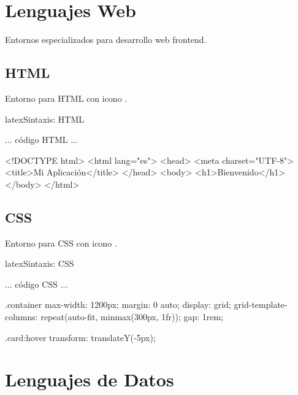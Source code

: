 \section{Lenguajes Web}
\label{sec:web}

Entornos especializados para desarrollo web frontend.

\subsection{HTML}

Entorno para HTML con icono .

\begin{codigosimple}{latex}{Sintaxis: HTML}
\begin{htmlcode}
  ... código HTML ...
\end{htmlcode}
\end{codigosimple}

\begin{htmlcode}
<!DOCTYPE html>
<html lang="es">
<head>
    <meta charset="UTF-8">
    <title>Mi Aplicación</title>
</head>
<body>
    <h1>Bienvenido</h1>
</body>
</html>
\end{htmlcode}

\subsection{CSS}

Entorno para CSS con icono .

\begin{codigosimple}{latex}{Sintaxis: CSS}
\begin{csscode}
  ... código CSS ...
\end{csscode}
\end{codigosimple}

\begin{csscode}
.container {
    max-width: 1200px;
    margin: 0 auto;
    display: grid;
    grid-template-columns: repeat(auto-fit, minmax(300px, 1fr));
    gap: 1rem;
}

.card:hover {
    transform: translateY(-5px);
}
\end{csscode}

\section{Lenguajes de Datos}
\label{sec:datos}

